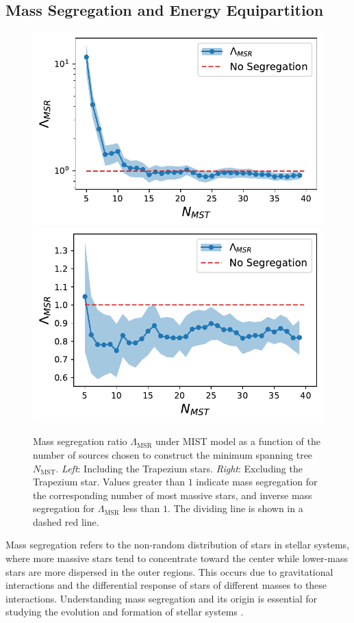 \documentclass[12pt]{ucsddissertation}
\begin{document}
\begin{CJK*}{UTF8}{gbsn}
\subsection{Mass Segregation and Energy Equipartition}
\label{onc-subsec:segregation}
\begin{figure}[htb!]
    \centering
    \includegraphics[width=0.496\linewidth]{figures/chapter1/MSR-MIST-all.pdf}
    \includegraphics[width=0.496\linewidth]{figures/chapter1/MSR-MIST-no_trapezium.pdf}
    \caption[Mass segregation ratio with varying $N_\mathrm{MST}$]{Mass segregation ratio $\Lambda_\mathrm{MSR}$ under MIST model as a function of the number of sources chosen to construct the minimum spanning tree $N_\mathrm{MST}$. \textit{Left}: Including the Trapezium stars. \textit{Right}: Excluding the Trapezium star. Values greater than $1$ indicate mass segregation for the corresponding number of most massive stars, and inverse mass segregation for $\Lambda_\mathrm{MSR}$ less than $1$. The dividing line is shown in a dashed red line.}
    \label{fig:segregation}
\end{figure}

Mass segregation refers to the non-random distribution of stars in stellar systems, where more massive stars tend to concentrate toward the center while lower-mass stars are more dispersed in the outer regions. This occurs due to gravitational interactions and the differential response of stars of different masses to these interactions. Understanding mass segregation and its origin is essential for studying the evolution and formation of stellar systems \citep[e.g.,][]{Fregeau-2002, Baumgardt-2008}.


\end{CJK*}
\end{document}
